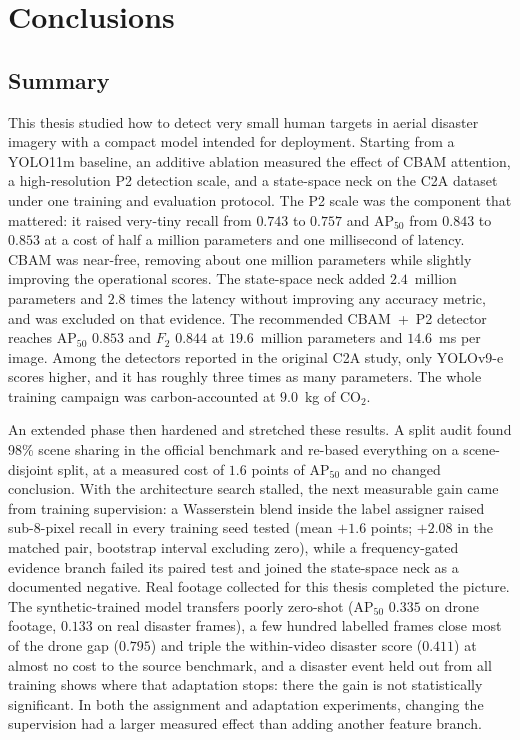\chapter{Conclusions}

\section{Summary}
This thesis studied how to detect very small human targets in aerial disaster
imagery with a compact model intended for deployment. Starting from a YOLO11m
baseline, an additive ablation measured the effect of CBAM attention, a
high-resolution P2 detection scale, and a state-space neck on the C2A dataset
under one training and evaluation protocol. The P2 scale was the component
that mattered: it raised very-tiny recall from $0.743$ to $0.757$ and
$\mathrm{AP}_{50}$ from $0.843$ to $0.853$ at a cost of half a million
parameters and one millisecond of latency. CBAM was near-free, removing about
one million parameters while slightly improving the operational scores. The
state-space neck added $2.4$~million parameters and $2.8$ times the latency
without improving any accuracy metric, and was excluded on that evidence. The
recommended CBAM~+~P2 detector reaches $\mathrm{AP}_{50}$ $0.853$ and $F_2$
$0.844$ at $19.6$~million parameters and $14.6$~ms per image. Among the
detectors reported in the original C2A study, only YOLOv9-e scores higher, and
it has roughly three times as many parameters. The whole
training campaign was carbon-accounted at $9.0$~kg of CO$_2$.

An extended phase then hardened and stretched these results. A split audit
found 98\% scene sharing in the official benchmark and re-based everything on
a scene-disjoint split, at a measured cost of $1.6$ points of
$\mathrm{AP}_{50}$ and no changed conclusion. With the architecture search
stalled, the next measurable gain came from training supervision: a Wasserstein
blend inside the label assigner raised sub-8-pixel recall in every training
seed tested (mean $+1.6$ points; $+2.08$ in the matched pair, bootstrap
interval excluding zero), while a frequency-gated
evidence branch failed its paired test and joined the state-space neck as a
documented negative. Real footage collected for this thesis completed the
picture. The synthetic-trained model transfers poorly zero-shot
($\mathrm{AP}_{50}$ $0.335$ on drone footage, $0.133$ on real disaster
frames), a few hundred labelled frames close most of the drone gap ($0.795$)
and triple the within-video disaster score ($0.411$) at almost no cost to
the source benchmark, and a disaster event held out from all training shows
where that adaptation stops: there the gain is not statistically
significant. In both the assignment and adaptation experiments, changing the
supervision had a larger measured effect than adding another feature branch.

